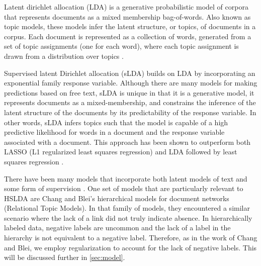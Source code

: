 Latent dirichlet allocation (LDA) is a generative
probabilistic model of corpora that represents documents as a mixed
membership bag-of-words. Also known as topic models, these models
infer the latent structure, or topics, of documents in a corpus. Each
document is represented as a collection of words, generated from a
set of topic assignments (one for each word), where each topic assignment
is drawn from a distribution over topics \citep{Blei2003}.

Supervised latent Dirichlet allocation (sLDA) builds on LDA by incorporating
an exponential family response variable. Although there are many models
for making predictions based on free text, sLDA is unique in that
it is a generative model, it represents documents as a mixed-membership,
and constrains the inference of the latent structure of the documents
by its predictability of the response variable. In other words, sLDA
infers topics such that the model is capable of a high predictive
likelihood for words in a document and the response variable associated
with a document. This approach has been shown to outperform both LASSO
(L1 regularized least squares regression) and LDA followed by least
squares regression \citep{BleiMcAuliffe2008}.

There have been many models that incorporate both latent models of
text and some form of supervision \citep{Ramage2009,DiscLDA,wangbleifeifei08,RelationalLDA}.
One set of models that are particularly relevant to HSLDA are Chang
and Blei's hierarchical models for document networks (Relational Topic
Models). In that family of models, they encountered a similar scenario
where the lack of a link did not truly indicate absence. In hierarchically
labeled data, negative labels are uncommon and the lack of a label
in the hierarchy is not equivalent to a negative label. Therefore,
as in the work of Chang and Blei, we employ regularization to account
for the lack of negative labels. This will be discussed further in
\ref{sec:model}.

